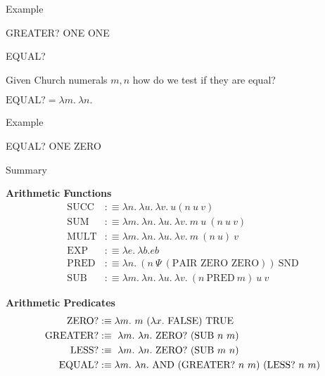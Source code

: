 \documentclass{beamer}
\begin{document}
\begin{frame}{Example}

  GREATER? ONE ONE
  \vspace{6cm}
  
\end{frame}

\begin{frame}{EQUAL?}

  Given Church numerals $m,n$ how do we test if they are equal?
  
  \vspace{0.3cm}

  $\text{EQUAL?} = \lambda m. \ \lambda n. \ $

\vspace{6cm}      
\end{frame}

\begin{frame}{Example}

  EQUAL? ONE ZERO
  \vspace{6cm}
  
\end{frame}

\begin{frame}{Summary}
  
  {\bf Arithmetic Functions}
  \begin{align*}
      \text{SUCC} &:\equiv \lambda n. \ \lambda u. \ \lambda v. \ u(n \ u \ v) \\
      \text{SUM} &:\equiv \lambda m. \ \lambda n. \ \lambda u. \ \lambda v. \ m \ u\ (n \ u \ v)\\
      \text{MULT} &:\equiv \lambda m. \ \lambda n. \ \lambda u. \ \lambda v. \ m \ (n \ u) \ v \\
      \text{EXP} &:\equiv \lambda e. \ \lambda b. eb \ \\
      \text{PRED} &:\equiv \lambda n.  \ (n \ \Psi \ (\text{PAIR ZERO ZERO})) \ \text{SND}  \\
      \text{SUB} &:\equiv \lambda m. \ \lambda n. \ \lambda u. \ \lambda v. \ (n \ \text{PRED} \ m) \ u \ v
  \end{align*}
  
  {\bf Arithmetic Predicates}
  \begin{align*}
      \text{ZERO?} &:\equiv \lambda m. \ m \ (\lambda x. \ \FALSE) \ \TRUE \ \\
      \text{GREATER?} &:\equiv \ \lambda m. \ \lambda n. \ \text{ZERO?} \ (\text{SUB} \ n \ m) \\
      \text{LESS?} &:\equiv \ \lambda m. \ \lambda n. \ \text{ZERO?} \ (\text{SUB} \ m \ n) \\
      \text{EQUAL?} &:\equiv \lambda m. \ \lambda n. \ \AND \ (\text{GREATER?} \ n \ m) \ (\text{LESS?} \ n \ m) 
  \end{align*}      
\end{frame}
\end{document}
